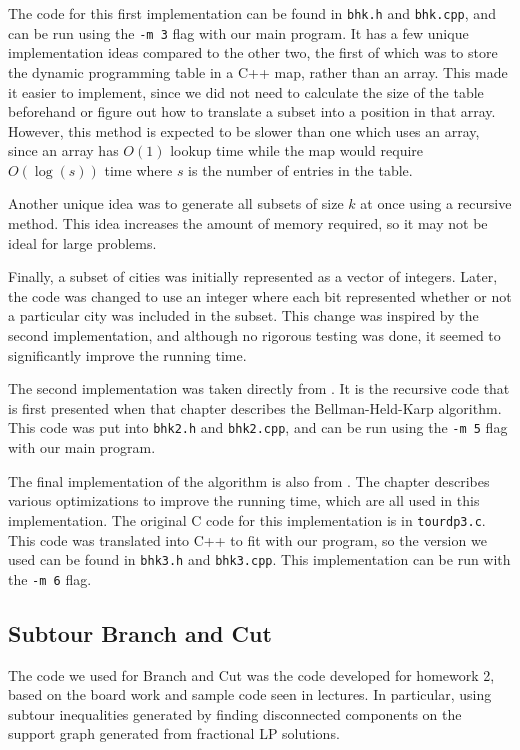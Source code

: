 \documentclass[11pt]{article}
\begin{document}
The code for this first implementation can be found in \texttt{bhk.h} and \texttt{bhk.cpp}, and can be run using the \texttt{-m 3} flag with our main program. It has a few unique implementation ideas compared to the other two, the first of which was to store the dynamic programming table in a C++ map, rather than an array. This made it easier to implement, since we did not need to calculate the size of the table beforehand or figure out how to translate a subset into a position in that array. However, this method is expected to be slower than one which uses an array, since an array has $O(1)$ lookup time while the map would require $O(\log(s))$ time where $s$ is the number of entries in the table.

Another unique idea was to generate all subsets of size $k$ at once using a recursive method. This idea increases the amount of memory required, so it may not be ideal for large problems.

Finally, a subset of cities was initially represented as a vector of integers. Later, the code was changed to use an integer where each bit represented whether or not a particular city was included in the subset. This change was inspired by the second implementation, and although no rigorous testing was done, it seemed to significantly improve the running time.

The second implementation was taken directly from \cite{bico}. It is the recursive code that is first presented when that chapter describes the Bellman-Held-Karp algorithm. This code was put into \texttt{bhk2.h} and \texttt{bhk2.cpp}, and can be run using the \texttt{-m 5} flag with our main program.

The final implementation of the algorithm is also from \cite{bico}. The chapter describes various optimizations to improve the running time, which are all used in this implementation. The original C code for this implementation is in \texttt{tour{\textunderscore}dp3.c}. This code was translated into C++ to fit with our program, so the version we used can be found in \texttt{bhk3.h} and \texttt{bhk3.cpp}. This implementation can be run with the \texttt{-m 6} flag.

\subsection{Subtour Branch and Cut}

The code we used for Branch and Cut was the code developed for homework 2, based on the board work and sample code seen in lectures. In particular, using subtour inequalities generated by finding disconnected components on the support graph generated from fractional LP solutions.
\end{document}
